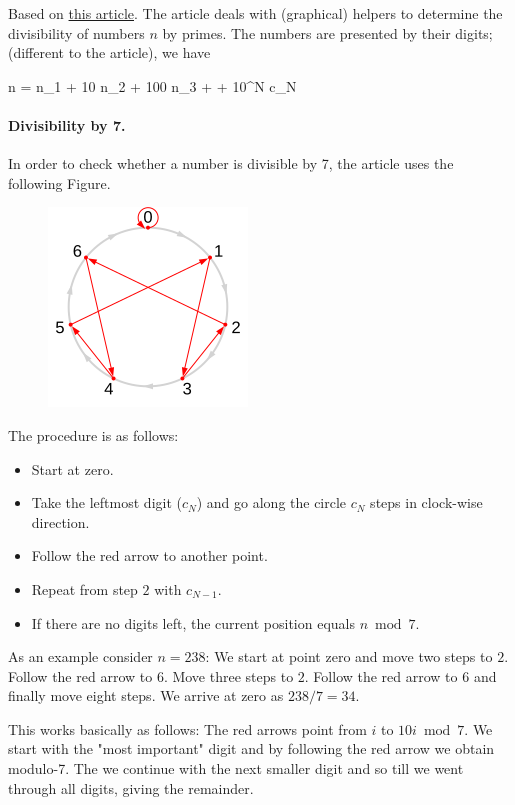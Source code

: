 

Based on \href{https://exupero.org/hazard/post/prime-modulo/}{this article}. The article deals with (graphical) helpers to determine the divisibility of numbers $n$ by primes. The numbers are presented by their digits; (different to the article), we have

\bee
n = n_1 + 10 n_2 + 100 n_3 + \cdots + 10^N c_N
\eee


\paragraph{Divisibility by 7.} In order to check whether a number is divisible by 7, the article uses the following Figure.

\begin{figure}[H]
	\includegraphics[scale=1.5]{images/divisibility_7.png}
\end{figure}

The procedure is as follows:

\begin{itemize}
	\item Start at zero.
	\item Take the leftmost digit ($c_N$) and go along the circle $c_N$ steps in clock-wise direction.
	\item Follow the red arrow to another point.
	\item Repeat from step $2$ with $c_{N-1}$.
	\item If there are no digits left, the current position equals $n \bmod 7$.
\end{itemize}

As an example consider $n = 238$: We start at point zero and move two steps to $2$. Follow the red arrow to $6$. Move three steps to $2$. Follow the red arrow to $6$ and finally move eight steps. We arrive at zero as $238 / 7 = 34$.

This works basically as follows: The red arrows point from $i$ to $10i \bmod 7$. We start with the "most important" digit and by following the red arrow we obtain modulo-7. The we continue with the next smaller digit and so till we went through all digits, giving the remainder.


